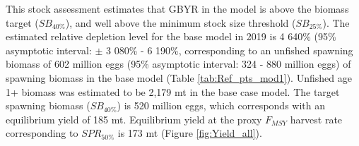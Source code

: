 \documentclass[12pt,]{article}
\begin{document}
This stock assessment estimates that GBYR in the model is above the
biomass target (\(SB_{40\%}\)), and well above the minimum stock size
threshold (\(SB_{25\%}\)). The estimated relative depletion level for
the base model in 2019 is 4 640\% (95\% asymptotic interval: \(\pm\) 3
080\% - 6 190\%, corresponding to an unfished spawning biomass of 602
million eggs (95\% asymptotic interval: 324 - 880 million eggs) of
spawning biomass in the base model (Table \ref{tab:Ref_pts_mod1}).
Unfished age 1+ biomass was estimated to be 2,179 mt in the base case
model. The target spawning biomass (\(SB_{40\%}\)) is 520 million eggs,
which corresponds with an equilibrium yield of 185 mt. Equilibrium yield
at the proxy \(F_{MSY}\) harvest rate corresponding to \(SPR_{50\%}\) is
173 mt (Figure \ref{fig:Yield_all}).

\FloatBarrier
\end{document}
